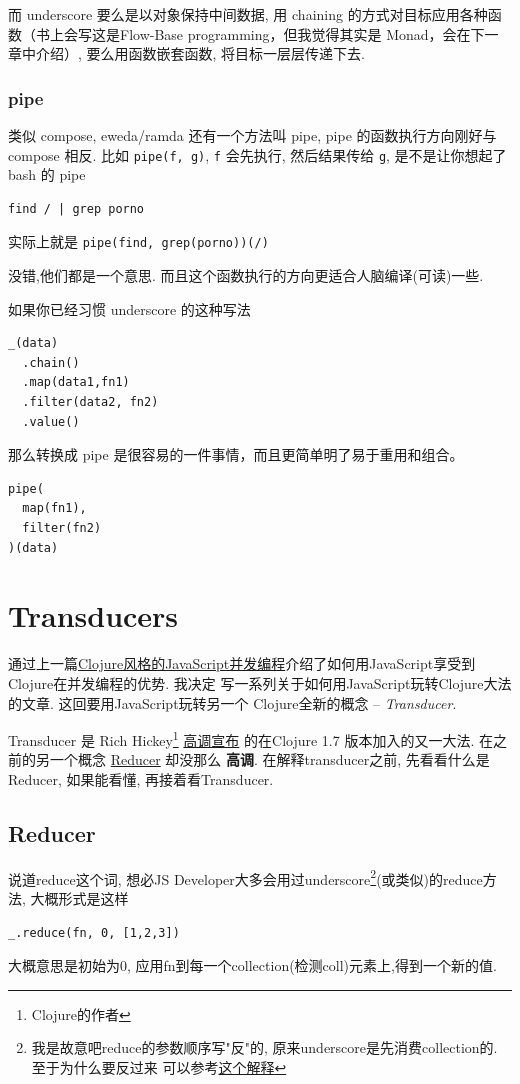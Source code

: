 \documentclass[a5paper]{book}
\begin{document}
而 underscore 要么是以对象保持中间数据, 用 chaining
的方式对目标应用各种函数（书上会写这是Flow-Base
programming，但我觉得其实是 Monad，会在下一章中介绍）,
要么用函数嵌套函数, 将目标一层层传递下去.

\section{pipe}
\label{sec:orgheadline21}

类似 compose, eweda/ramda 还有一个方法叫 pipe, pipe 的函数执行方向刚好与
compose 相反. 比如 \texttt{pipe(f, g)}, \texttt{f} 会先执行, 然后结果传给 \texttt{g},
是不是让你想起了 bash 的 pipe

\begin{verbatim}
find / | grep porno
\end{verbatim}

实际上就是 \texttt{pipe(find, grep(porno))(/)}

没错,他们都是一个意思. 而且这个函数执行的方向更适合人脑编译(可读)一些.

如果你已经习惯 underscore 的这种写法

\begin{verbatim}
_(data)
  .chain()
  .map(data1,fn1)
  .filter(data2, fn2)
  .value()
\end{verbatim}

那么转换成 pipe 是很容易的一件事情，而且更简单明了易于重用和组合。

\begin{verbatim}
pipe(
  map(fn1),
  filter(fn2)
)(data)
\end{verbatim}
\part{Transducers}
\label{sec:orgheadline31}
通过上一篇\href{./clojure-core.async-essence-in-native-javascript.org}{Clojure风格的JavaScript并发编程}介绍了如何用JavaScript享受到Clojure在并发编程的优势. 我决定
写一系列关于如何用JavaScript玩转Clojure大法的文章. 这回要用JavaScript玩转另一个
Clojure全新的概念 -- \emph{Transducer}.

Transducer 是 Rich Hickey\footnote{Clojure的作者} \href{http://blog.cognitect.com/blog/2014/8/6/transducers-are-coming}{高调宣布} 的在Clojure 1.7 版本加入的又一大法. 在之前的另一个概念
\href{http://clojure.com/blog/2012/05/15/anatomy-of-reducer.html}{Reducer} 却没那么 \textbf{高调}. 在解释transducer之前, 先看看什么是Reducer, 如果能看懂, 再接着看Transducer.

\chapter{Reducer}
\label{sec:orgheadline27}
说道reduce这个词, 想必JS Developer大多会用过underscore\footnote{我是故意吧reduce的参数顺序写"反"的, 原来underscore是先消费collection的. 至于为什么要反过来
可以参考\href{http://blog.oyanglul.us/javascript/functional-javascript.html#sec-3-2}{这个解释}}(或类似)的reduce方法, 大概形式是这样
\begin{verbatim}
_.reduce(fn, 0, [1,2,3])
\end{verbatim}
大概意思是初始为0, 应用fn到每一个collection(检测coll)元素上,得到一个新的值.
\end{document}
